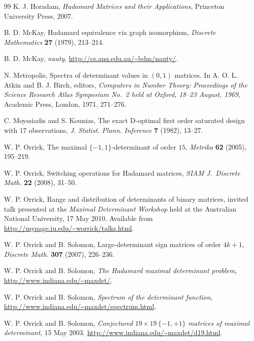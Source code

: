\documentclass[11pt,a4paper]{article}
\begin{document}
\begin{thebibliography}{99}
K. J. Horadam,	%
\emph{Hadamard Matrices and their Applications},
Princeton University Press, 2007.

B. D. McKay,
Hadamard equivalence via graph isomorphism,
\emph{Discrete Mathematics} \textbf{27} (1979), 213--214.

B. D. McKay,  
\emph{nauty}, \url{http://cs.anu.edu.au/~bdm/nauty/}.

N. Metropolis, Spectra of determinant values in $(0, 1)$ matrices. 
In A. O. L. Atkin and B. J. Birch, editors, 
\emph{Computers in Number Theory: Proceedings of
the Science Research Atlas Symposium No.~2 held at Oxford, 18--23
August, 1969}, Academic Press, London, 1971, 271--276.

C. Moyssiadis and S. Kounias, %
The exact D-optimal first order saturated design with $17$ observations,
\emph{J. Statist. Plann. Inference} \textbf{7} (1982), 13--27.

W. P. Orrick, %
The maximal {$\{-1,1\}$}-determinant of order $15$,
\emph{Metrika} \textbf{62} (2005), 195--219.

W. P. Orrick, %
Switching operations for {H}adamard matrices,
\emph{SIAM J.\ Discrete Math.} \textbf{22} (2008), 31--50.

W. P. Orrick,
Range and distribution of determinants of binary matrices,
invited talk
presented at the \emph{Maximal Determinant Workshop} held at
the Australian National University, 17 May 2010.
Available from 
\url{http://mypage.iu.edu/~worrick/talks.html}. 

W. P. Orrick and B. Solomon,
Large-determinant sign matrices of order $4k+1$, 
\emph{Discrete Math.} \textbf{307} (2007), 226--236.

W. P. Orrick and B. Solomon,
\emph{The Hadamard maximal determinant problem},
\url{http://www.indiana.edu/~maxdet/}.

W. P. Orrick and B. Solomon,
\emph{Spectrum of the determinant function},
\url{http://www.indiana.edu/~maxdet/spectrum.html}.

W. P. Orrick and B. Solomon, 
\emph{Conjectured $19 \times 19\ \{-1, +1\}$ matrices of maximal determinant},
15 May 2003. 
\url{http://www.indiana.edu/~maxdet/d19.html}.


\end{thebibliography}
\end{document}
